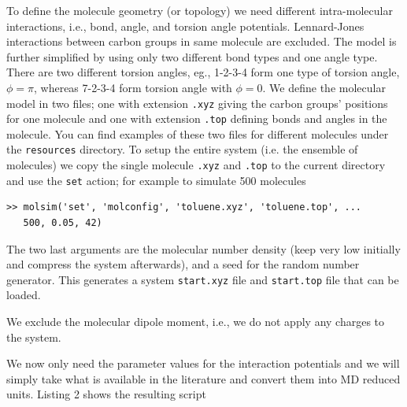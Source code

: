 \documentclass[11pt]{article}
\begin{document}
To define the molecule geometry (or topology) we need different intra-molecular
interactions, i.e., bond, angle, and torsion angle potentials. Lennard-Jones
interactions between carbon groups in same molecule are excluded. The model is
further simplified by using only two different bond types and one angle
type. There are two different torsion angles, eg., 1-2-3-4 form one type of
torsion angle, $\phi=\pi$, whereas 7-2-3-4 form torsion angle with $\phi=0$. We
define the molecular model in two files; one with extension \verb!.xyz! giving
the carbon groups' positions for one molecule and one with extension \verb!.top!
defining bonds and angles in the molecule. You can find examples of these two
files for different molecules under the \verb!resources!  directory. To setup
the entire system (i.e. the ensemble of molecules) we copy the single molecule
\verb!.xyz!  and \verb!.top! to the current directory and use the \verb!set!
action; for example to simulate 500 molecules 
\begin{verbatim}
>> molsim('set', 'molconfig', 'toluene.xyz', 'toluene.top', ... 
   500, 0.05, 42)
\end{verbatim}
The two last arguments are the molecular number density (keep very low initially
and compress the system afterwards), and a seed for the random number
generator. This generates a system \verb!start.xyz! file and \verb!start.top!
file that can be loaded. 

We exclude the molecular dipole moment, i.e., we do not apply any charges to the
system. 

We now only need the parameter values for the interaction potentials and we will
simply take what is available in the literature \cite{Hansen} and convert them
into MD reduced units. Listing 2 shows the resulting script

\bigskip
\end{document}
